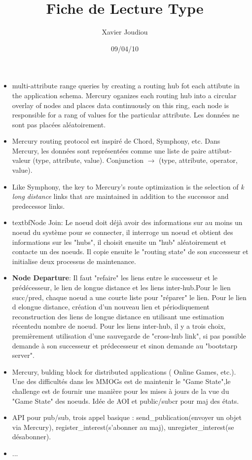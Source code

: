 \documentclass[11pt,a4paper]{article}
\title{Fiche de Lecture Type}
\author{Xavier Joudiou}
\date{09/04/10}
\begin{document}
	
  \begin{itemize}
  \renewcommand{\labelitemi}{$\Rightarrow$}
	\item multi-attribute range queries by creating a routing hub fot each attibute in the application schema. Mercury oganizes each routing hub into a circular overlay of nodes and places data continuously on this ring, each node is responsible for a rang of values for the particular attribute. Les données ne sont pas placées aléatoirement. 
	\item Mercury routing protocol est inspiré de Chord, Symphony, etc. Dans Mercury, les données sont représentées comme une liste de paire attibut-valeur (type, attribute, value). Conjunction $\rightarrow$ (type, attribute, operator, value). 
	\item Like Symphony, the key to Mercury's route optimization is the selection of \textit{k long distance} links that are maintained in addition to the successor and predecessor links.	
	\item textbf{Node Join}: Le noeud doit déjà avoir des informations sur au moins un noeud du système pour se connecter, il interroge un noeud et obtient des informations sur les "hubs", il choisit ensuite un "hub" aléatoirement et contacte un des noeuds. Il copie ensuite le "routing state" de son successeur et initialise deux processus de maintenance.
	\item \textbf{Node Departure}: Il faut "refaire" les liens entre le successeur et le prédécesseur, le lien de longue distance et les liens inter-hub.Pour le lien succ/pred, chaque noeud a une courte liste pour "réparer" le lien. Pour le lien d elongue distance, création d'un nouveau lien et périodiquement reconstruction des liens de longue distance en utilisant une estimation récentedu nombre de noeud. Pour les liens inter-hub, il y a trois choix, premièrement utilisation d'une sauvegarde de "cross-hub link", si pas possible demande à son successeur et prédecesseur et sinon demande au "bootstarp server".
	\item Mercury, bulding block for distributed applications ( Online Games, etc.). Une des difficultés dans les MMOGs est de maintenir le "Game State",le challenge est de fournir une manière pour les mises à jours de la vue du "Game State" des noeuds. Idée de AOI et public/subcr pour maj des états.
	\item API pour pub/sub, trois appel basique : send\_publication(envoyer un objet via Mercury), register\_interest(s'abonner au maj), unregister\_interest(se désabonner).
	\item ...
  \end{itemize}
\end{document}
